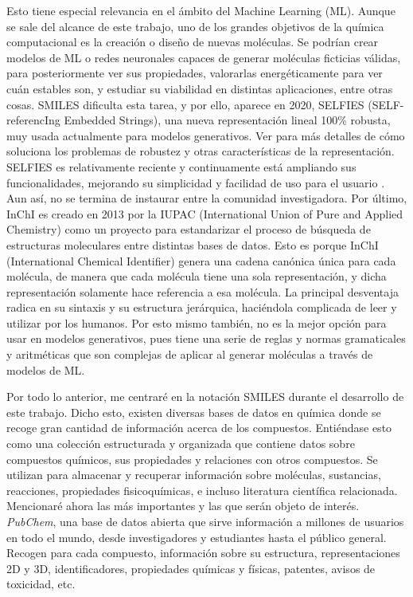 Esto tiene especial relevancia en el ámbito del Machine Learning (ML). Aunque se sale del alcance de este trabajo, uno de los grandes objetivos de la química computacional es la creación o diseño de nuevas moléculas. Se podrían crear modelos de ML o redes neuronales capaces de generar moléculas ficticias válidas, para posteriormente ver sus propiedades, valorarlas energéticamente para ver cuán estables son, y estudiar su viabilidad en distintas aplicaciones, entre otras cosas. SMILES dificulta esta tarea, y por ello, aparece en 2020, SELFIES (SELF-referencIng Embedded Strings), una nueva representación lineal 100\% robusta, muy usada actualmente para modelos generativos. Ver \cite{SELFIES, krenn_self_referencing_2020} para más detalles de cómo soluciona los problemas de robustez y otras características de la representación. SELFIES es relativamente reciente y continuamente está ampliando sus funcionalidades, mejorando su simplicidad y facilidad de uso para el usuario \cite{selfies_recent_2023}. Aun así, no se termina de instaurar entre la comunidad investigadora. Por último, InChI es creado en 2013 por la IUPAC (International Union of Pure and Applied Chemistry) como un proyecto para estandarizar el proceso de búsqueda de estructuras moleculares entre distintas bases de datos. Esto es porque InChI (International Chemical Identifier) genera una cadena canónica única para cada molécula, de manera que cada molécula tiene una sola representación, y dicha representación solamente hace referencia a esa molécula. La principal desventaja radica en su sintaxis y su estructura jerárquica, haciéndola complicada de leer y utilizar por los humanos. Por esto mismo también, no es la mejor opción para usar en modelos generativos, pues tiene una serie de reglas y normas gramaticales y aritméticas que son complejas de aplicar al generar moléculas a través de modelos de ML.\cite{heller_inchi_2015}


Por todo lo anterior, me centraré en la notación SMILES durante el desarrollo de este trabajo. Dicho esto, existen diversas bases de datos en química donde se recoge gran cantidad de información acerca de los compuestos. Entiéndase esto como una colección estructurada y organizada que contiene datos sobre compuestos químicos, sus propiedades y relaciones con otros compuestos. Se utilizan para almacenar y recuperar información sobre moléculas, sustancias, reacciones, propiedades fisicoquímicas, e incluso literatura científica relacionada. Mencionaré ahora las más importantes y las que serán objeto de interés. \emph{PubChem}, una base de datos abierta que sirve información a millones de usuarios en todo el mundo, desde investigadores y estudiantes hasta el público general. Recogen para cada compuesto, información sobre su estructura, representaciones 2D y 3D, identificadores, propiedades químicas y físicas, patentes, avisos de toxicidad, etc. \cite{pubchem_website} 


